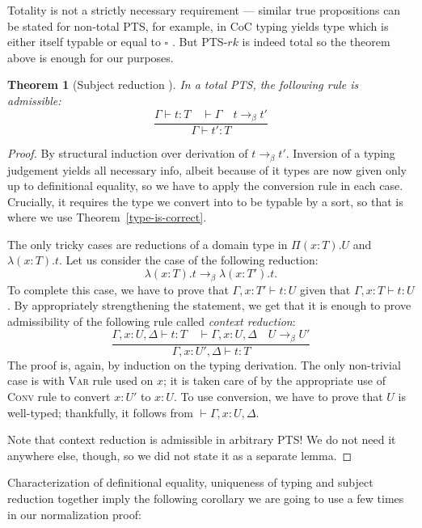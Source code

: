 \documentclass{article}
\newtheorem{theorem}{Theorem}
\theoremstyle{definition}
\theoremstyle{remark}
\begin{document}
Totality is not a strictly necessary requirement ---
similar true propositions can be stated for non-total
PTS, for example, in CoC typing yields type which is
either itself typable or equal to $\square$
\cite{barendregt1992lambda,luo1994computation}. But
PTS-$rk$ is indeed total so the theorem above is enough
for our purposes.

\begin{theorem}[Subject reduction ]
    In a total PTS, the following rule is admissible:
    \[\dfrac{
        \Gamma\vdash t:T \quad \vdash\Gamma
        \quad t \to_\beta t'
    }{\Gamma\vdash t':T}\]
\end{theorem}
\begin{proof}
    By structural induction over derivation of
    $t\to_\beta t'$. Inversion of a typing judgement
    yields all necessary info, albeit because of it
    types are now given only up to definitional
    equality, so we have to apply the conversion rule
    in each case. Crucially, it requires the type we
    convert into to be typable by a sort, so that is
    where we use Theorem~\ref{type-is-correct}.

    The only tricky cases are reductions of a domain
    type in $\Pi(x:T).U$ and $\lambda(x:T).t$. Let us
    consider the case of the following reduction:
    \[\lambda(x:T).t \to_\beta \lambda(x:T').t.\]
    To complete this case, we have to prove that
    $\Gamma,x:T'\vdash t:U$ given that
    $\Gamma,x:T\vdash t:U$. By appropriately
    strengthening the statement, we get that it is
    enough to prove admissibility of the following rule
    called \emph{context reduction}:
    \[\dfrac{
        \Gamma,x:U,\Delta\vdash t:T\quad
        \vdash\Gamma,x:U,\Delta\quad U\to_\beta U'
    }{\Gamma,x:U',\Delta\vdash t:T}\]
    The proof is, again, by induction on the typing
    derivation. The only non-trivial case is with
    \textsc{Var} rule used on $x$; it is taken care of
    by the appropriate use of \textsc{Conv} rule to
    convert $x:U'$ to $x:U$. To use conversion, we have
    to prove that $U$ is well-typed; thankfully, it
    follows from $\vdash\Gamma,x:U,\Delta$.

    Note that context reduction is admissible in
    arbitrary PTS! We do not need it anywhere else,
    though, so we did not state it as a separate lemma.
\end{proof}

Characterization of definitional equality, uniqueness
of typing and subject reduction together imply the
following corollary we are going to use a few times in
our normalization proof:
\end{document}
